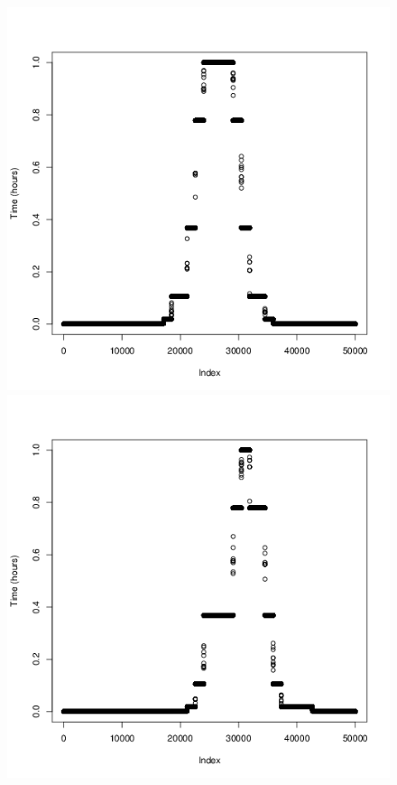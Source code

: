 \documentclass[a4paper, twocolumn]{article}
\begin{document}
\begin{figure}[H]
\begin{minipage}[]{0.2\textwidth}
	    \end{minipage}
	    \begin{minipage}[]{0.2\textwidth}
	   		 \includegraphics[width=\textwidth]{share/5_time.png}
	    \end{minipage}
	    \begin{minipage}[]{0.2\textwidth}
	    	\includegraphics[width=\textwidth]{share/6_time.png}

\end{minipage}
\end{figure}
\end{document}
